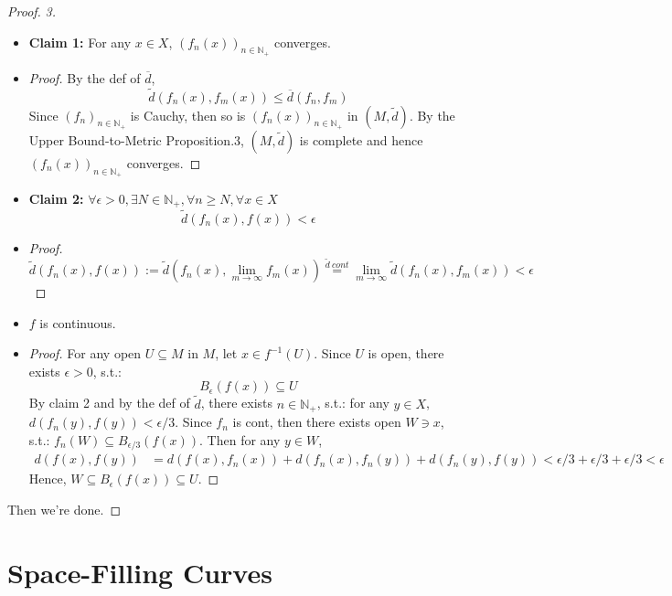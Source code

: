 \begin{proof}
    \textit{3.} \begin{itemize}
        \item \textbf{Claim 1:} For any $x \in X$, $(f_n(x))_{n \in \mathbb{N}_+}$ converges.
        \item \begin{proof}
            By the def of $\overline{d}$,
            $$\tilde{d} (f_n(x), f_m(x)) \leq \overline{d} (f_n,f_m)$$
            Since $(f_n)_{n\in \mathbb{N}_+}$ is Cauchy, then so is $(f_n(x))_{n \in \mathbb{N}_+}$ in $(M,\tilde{d})$. By the Upper Bound-to-Metric Proposition.3, $(M,\tilde{d})$ is complete and hence $(f_n(x))_{n \in \mathbb{N}_+}$ converges.
        \end{proof}

        \item \textbf{Claim 2:} $\forall{\epsilon>0}, \exists{N \in \mathbb{N}_+}, \forall{n \geq N}, \forall {x \in X}$
        $$ \tilde{d}(f_n(x), f(x))<\epsilon$$
        \item \begin{proof}
            $$\tilde{d} (f_n(x), f(x)) := \tilde{d} (f_n(x), \lim_{m \to \infty} f_m(x)) \overset{\tilde{d}\:cont}{=} \lim_{m\to \infty} \tilde{d} (f_n(x), f_m(x)) <\epsilon$$
        \end{proof}

        \item $f$ is continuous.
        \item \begin{proof}
            For any open $U \subseteq M$ in $M$, let $x \in f^{-1} (U)$. Since $U$ is open, there exists $\epsilon>0$, s.t.:
            $$B_\epsilon (f(x)) \subseteq U$$
            By claim 2 and by the def of $\tilde{d}$, there exists $n \in \mathbb{N}_+$, s.t.: for any $y \in X$, $d(f_n(y),f(y)) <\epsilon/3$. Since $f_n$ is cont, then there exists open $W \ni x$, s.t.: $f_n (W) \subseteq B_{\epsilon/3} (f(x))$. Then for any $y \in W$,
            \begin{align*}
                d(f(x),f(y))&= d(f(x),f_n(x))+ d(f_n(x),f_n(y))+ d(f_n(y),f(y)) < \epsilon/3 + \epsilon/3 +\epsilon/3 <\epsilon
            \end{align*}
            Hence, $W \subseteq B_\epsilon (f(x)) \subseteq U$.
        \end{proof}
    \end{itemize}
    Then we're done.
\end{proof}

\section{Space-Filling Curves}

